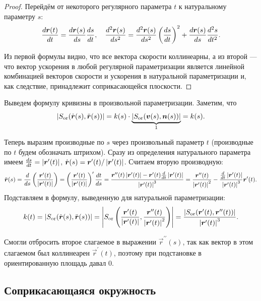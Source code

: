 \begin{proof}
	Перейдём от некоторого регулярного параметра $t$ к натуральному параметру $s$:
	\[
		\frac{d\boldsymbol{r}(t)}{dt} = \frac{d\boldsymbol{r}(s)}{ds} \frac{ds}{dt},\quad \frac{d^2\boldsymbol{r}(s)}{ds^2} = \frac{d^2\boldsymbol{r}(s)}{ds^2}\left(\frac{ds}{dt}\right)^2 + \frac{d\boldsymbol{r}(s)}{ds}\frac{d^2s}{dt^2}.
	\]

	Из первой формулы видно, что все вектора скорости коллинеарны, а из второй --- что вектор ускорения в любой регулярной параметризации является линейной комбинацией векторов скорости и ускорения в натуральной параметризации и, как следствие, принадлежит соприкасающейся плоскости.
\end{proof}

Выведем формулу кривизны в произвольной параметризации. Заметим, что
\[
	\left\lvert S_{\mathrm{or}}(\dot{\boldsymbol{r}}(s), \ddot{\boldsymbol{r}}(s))\right\rvert = k(s) \cdot \underbrace{\left\lvert S_{\mathrm{or}}(\boldsymbol{v}(s), \boldsymbol{n}(s))\right\rvert}_1 = k(s).
\]

Теперь выразим производные по $s$ через произвольный параметр $t$ (производные по $t$ будем обозначать штрихом). Сразу из определения натурального параметра имеем $\frac{ds}{dt} \hm= \abs{\vec{r}^\prime(t)}$, $\dot{\boldsymbol{r}}(s) = \boldsymbol{r}^\prime(t) / \left\lvert\boldsymbol{r}^\prime(t)\right\rvert$. Считаем вторую производную:
\[
	\ddot{\boldsymbol{r}}(s) = \frac{d}{ds}\left(\frac{\boldsymbol{r}^\prime(t)}{\left\lvert\boldsymbol{r}^\prime(t)\right\rvert}\right) = \left(\frac{\boldsymbol{r}^\prime(t)}{\left\lvert\boldsymbol{r}^\prime(t)\right\rvert}\right)^\prime \frac{dt}{ds} = \frac{\boldsymbol{r}^{\prime\prime}(t) \left\lvert\boldsymbol{r}^\prime(t)\right\rvert - \boldsymbol{r}^\prime(t)\frac{d}{dt}\left\lvert\boldsymbol{r}^\prime(t)\right\rvert}{\left\lvert\boldsymbol{r}^\prime(t)\right\rvert^3} = \frac{\boldsymbol{r}^{\prime\prime}(t)}{\left\lvert\boldsymbol{r}^\prime(t)\right\rvert^2} - \frac{\frac{d}{dt}\left\lvert\boldsymbol{r}^\prime(t)\right\rvert}{\left\lvert\boldsymbol{r}^\prime(t)\right\rvert^3}\boldsymbol{r}^\prime(t).
\]
Подставляем в формулу, выведенную для натуральной параметризации:
\begin{equation} \label{eq:CurvatureFormula}
	k(t) = \left\lvert S_{\mathrm{or}}(\dot{\boldsymbol{r}}(s), \ddot{\boldsymbol{r}}(s))\right\rvert = \left\lvert S_{\mathrm{or}}\left(\frac{\boldsymbol{r}^\prime(t)}{\left\lvert\boldsymbol{r}^\prime(t)\right\rvert}, \frac{\boldsymbol{r}^{\prime\prime}(t)}{\left\lvert\boldsymbol{r}^{\prime}(t)\right\rvert^2}\right)\right\rvert = \frac{\left\lvert S_{\mathrm{or}}(\boldsymbol{r}^\prime(t), \boldsymbol{r}^{\prime\prime}(t))\right\rvert}{\left\lvert\boldsymbol{r}^\prime(t)\right\rvert^3}.
\end{equation}

Смогли отбросить второе слагаемое в выражении $\vec{r}^{\prime\prime}(s)$, так как вектор в этом слагаемом был коллинеарен $\vec{r}^\prime(t)$, поэтому при подстановке в ориентированную площадь давал $0$.

\subsection{Соприкасающаяся окружность}

